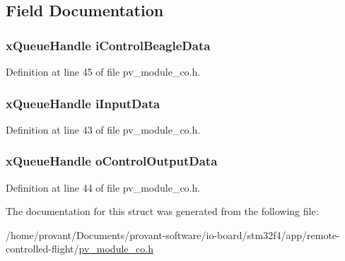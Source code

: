\subsection{Field Documentation}
\subsubsection[{\texorpdfstring{i\+Control\+Beagle\+Data}{iControlBeagleData}}]{\setlength{\rightskip}{0pt plus 5cm}x\+Queue\+Handle i\+Control\+Beagle\+Data}\hypertarget{structpv__interface__co_a0d6eb6afadef31d21002472d9e7266f9}{}\label{structpv__interface__co_a0d6eb6afadef31d21002472d9e7266f9}


Definition at line 45 of file pv\+\_\+module\+\_\+co.\+h.

\subsubsection[{\texorpdfstring{i\+Input\+Data}{iInputData}}]{\setlength{\rightskip}{0pt plus 5cm}x\+Queue\+Handle i\+Input\+Data}\hypertarget{structpv__interface__co_ad057767ef15274f0933ad1821fea7239}{}\label{structpv__interface__co_ad057767ef15274f0933ad1821fea7239}


Definition at line 43 of file pv\+\_\+module\+\_\+co.\+h.

\subsubsection[{\texorpdfstring{o\+Control\+Output\+Data}{oControlOutputData}}]{\setlength{\rightskip}{0pt plus 5cm}x\+Queue\+Handle o\+Control\+Output\+Data}\hypertarget{structpv__interface__co_adeb92ab25c31742c709ae51f96cbf10a}{}\label{structpv__interface__co_adeb92ab25c31742c709ae51f96cbf10a}


Definition at line 44 of file pv\+\_\+module\+\_\+co.\+h.



The documentation for this struct was generated from the following file\+:\begin{DoxyCompactItemize}
\item 
/home/provant/\+Documents/provant-\/software/io-\/board/stm32f4/app/remote-\/controlled-\/flight/\hyperlink{pv__module__co_8h}{pv\+\_\+module\+\_\+co.\+h}\end{DoxyCompactItemize}
